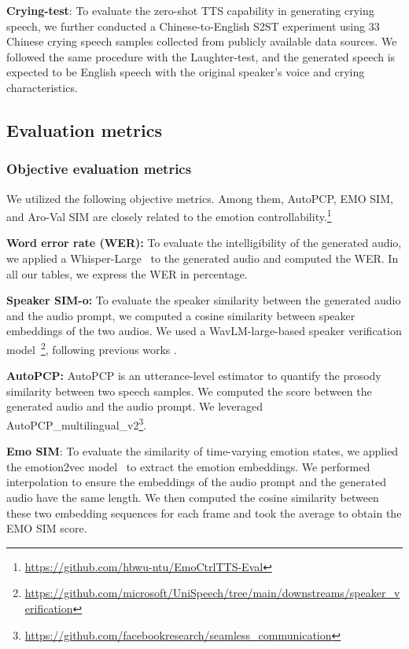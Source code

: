 \textbf{Crying-test}: 
To
evaluate the zero-shot TTS capability in generating crying speech, 
we further conducted a Chinese-to-English S2ST experiment
using 33 Chinese crying speech samples collected from publicly available data sources.
We followed the same procedure with the Laughter-test,
and the generated speech is expected to be English speech with the original speaker's voice and crying characteristics. 

\vspace{-.5em}
\subsection{Evaluation metrics}
\vspace{-.5em}

\subsubsection{Objective evaluation metrics}
\vspace{-.5em}

We utilized the following objective metrics. Among them, AutoPCP, EMO SIM, and Aro-Val SIM are closely related to the emotion controllability.\footnote{\textcolor{black}{\url{https://github.com/hbwu-ntu/EmoCtrlTTS-Eval}}}

\textbf{Word error rate (WER):} To evaluate the intelligibility of the generated audio, 
we applied a Whisper-Large~\cite{radford2023robust} to the generated audio and computed the WER. 
In all our tables, we express the WER in percentage.

\textbf{Speaker SIM-o:} To evaluate the speaker similarity between the generated audio and the audio prompt, we computed a cosine similarity between speaker embeddings of the two audios. We used a WavLM-large-based 
speaker verification model~\cite{chen2022wavlm}\footnote{\url{https://github.com/microsoft/UniSpeech/tree/main/downstreams/speaker\_verification}}, following previous works \cite{wang2023neural,le2024voicebox}.

\textbf{AutoPCP:} AutoPCP \cite{barrault2023seamless} is an utterance-level estimator to quantify the prosody similarity between two speech samples.
We computed the score between the generated audio and the audio prompt.
We leveraged AutoPCP\_multilingual\_v2\footnote{\url{https://github.com/facebookresearch/seamless\_communication}}.

\textbf{Emo SIM}: To evaluate the similarity of time-varying emotion states, we applied the emotion2vec model~\cite{ma2023emotion2vec} to extract the emotion embeddings. 
We performed interpolation to ensure the embeddings of the audio prompt and the generated audio have the same length. We then computed the cosine similarity between these two embedding sequences for each frame and took the average to obtain the EMO SIM score.
 

